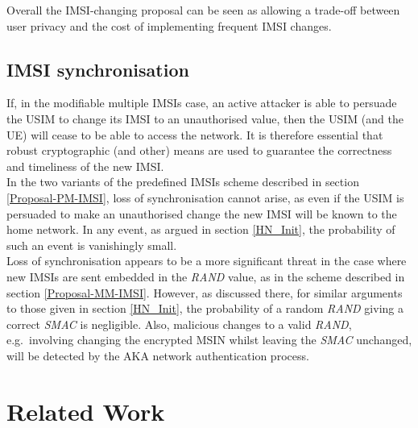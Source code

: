 \documentclass{acm_proc_article-sp}
\begin{document}
Overall the IMSI-changing proposal can be seen as allowing a trade-off between user privacy and the cost of implementing frequent IMSI changes.

\subsection{IMSI synchronisation} \label{IMSI-synch}

If, in the modifiable multiple IMSIs case, an active attacker is able to persuade the USIM to change its IMSI to an unauthorised value, then the USIM (and the UE) will cease to be able to access the network. It is therefore essential that robust cryptographic (and other) means are used to guarantee the correctness and timeliness of the new IMSI. \\

In the two variants of the predefined IMSIs scheme described in section \ref{Proposal-PM-IMSI}, loss of synchronisation cannot arise, as even if the USIM is persuaded to make an unauthorised change the new IMSI will be known to the home network.  In any event, as argued in section \ref{HN_Init}, the probability of such an event is vanishingly small. \\

Loss of synchronisation appears to be a more significant threat in the case where new IMSIs are sent embedded in the \emph{RAND} value, as in the scheme described in section \ref{Proposal-MM-IMSI}. However, as discussed there, for similar arguments to those given in section \ref{HN_Init}, the probability of a random \emph{RAND} giving a correct \emph{SMAC} is negligible. Also, malicious changes to a valid \emph{RAND}, e.g.\ involving changing the encrypted MSIN whilst leaving the \emph{SMAC} unchanged, will be detected by the AKA network authentication process. 


\section{Related Work} \label{RW}
\end{document}
